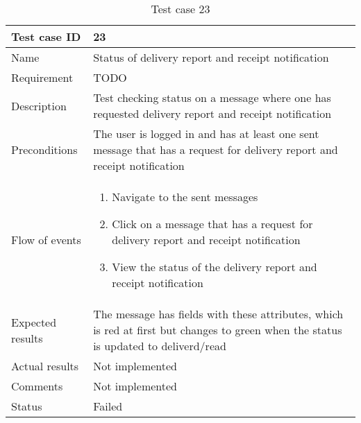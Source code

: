 		\begin{table}
			\begin{tabular}{l|p{10cm}}
				Test case ID & 23 \\ \hline
				Name & Status of delivery report and receipt notification\\ \hline
				Requirement &TODO\\ \hline
				Description & Test checking status on a message where one has requested delivery report and receipt notification\\ \hline
				Preconditions & The user is logged in and has at least one sent message that has a request for delivery report and receipt notification\\ \hline
				Flow of events & 
					\begin{enumerate}
						\item{}Navigate to the sent messages
						\item{}Click on a message that has a request for delivery report and receipt notification
						\item{}View the status of the delivery report and receipt notification
					\end{enumerate} \\ \hline
				Expected results & The message has fields with these attributes, which is red at first but changes to green when the status is updated to deliverd/read \\ \hline
				Actual results &Not implemented\\ \hline
				Comments & Not implemented\\ \hline
				Status & Failed\\ \hline
			\end{tabular}
			\caption{Test case 23} \label{tab:case23}
		\end{table}

